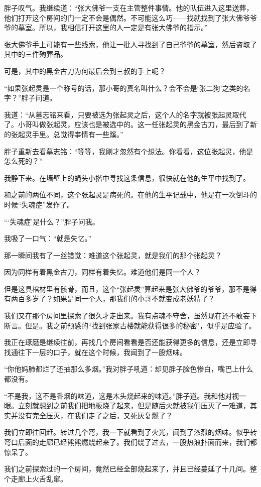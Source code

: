 胖子叹气。我继续道：“张大佛爷一支在主管整件事情。他的队伍进入这里送葬，他们打开这个房间的门一定不会是偶然。不可能这么巧——找就找到了张大佛爷爷爷的墓室。所以，我相信打开这里的人一定是有张大佛爷的指示。”

张大佛爷手上可能有一些线索，他让一批人寻找到了自己爷爷的墓室，然后盗取了其中的三件殉葬品。

可是，其中的黑金古刀为何最后会到三叔的手上呢？

“如果张起灵是一个称号的话，那小哥的真名叫什么？会不会是‘张二狗’之类的名字？”胖子问道。

我道：“从墓志铭来看，只要被选为张起灵之后，这个人的名字就被张起灵取代了。小哥叫做张起灵，应该也是被选中的。这一任张起灵的黑金古刀，最后到了新的张起灵手里。总觉得亊情有一些蹊。”

胖子重新去看墓志铭：“等等，我刚才忽然有个想法。你看看，这位张起灵，他是怎么死的？”

我静下来。在墙壁上的蝇头小揩中寻找这条信息，很快就在他的生平中找到了。

和之前的两位不同，这个张起灵是病死的。在他的生平记载中，他是在一次倒斗的时候“失魂症”发作了。

“‘失魂症’是什么？”胖子问我。

我吸了一口气：“就是失忆。”

那一瞬间我有了一丝错觉：难道这个张起灵，就是我们的那个张起灵？

因为同样有着黑金古刀，同样有着失忆。难道他们是同一个人？

但是这具棺材里有骸骨，而且，这个“张起灵”算起来是张大佛爷的爷爷，那不是得有两百多岁了？如果是同一个人，那我们的小哥不就变成老妖精了？

我们又在那个房间里探索了很久才走出来。我有点魂不守舍，虽然现在还不敢妄下断言。但是。我之前预感的“找到张家古楼就能获得很多的秘密"，似乎是应验了。

我正在琢磨是继续往前，再找几个房间看看是否还能获得更多的信息，还是立即寻找通往下一层的口子，就在这个时候，我闻到了一股烟味。

“你他妈肺都烂了还抽那么多烟。”我对胖子吼道：却见胖子脸色惨白，嘴巴上什么都没有。

“不是我，这不是香烟的味道，这是木头烧起来的味道。”胖子道。我和他对视一眼。立刻就想到之前我们把地板烧了起来，但是随后火就被我们压灭了一难道，其实并没有完全压灭，在我们走了之后，又死灰复燃了？

我们立即往回赶。转过几个弯，我一下就看到了火光，闻到了浓烈的烟味。似乎转弯口后面的走廊已经熊熊燃烧起来了。我们绕了过去，一股热浪扑面而来，我们都惊呆了。

我们之前探索过的一个房间，竟然已经全部烧起来了，并且已经蔓延了十几间。整个走廊上火舌乱窜。

